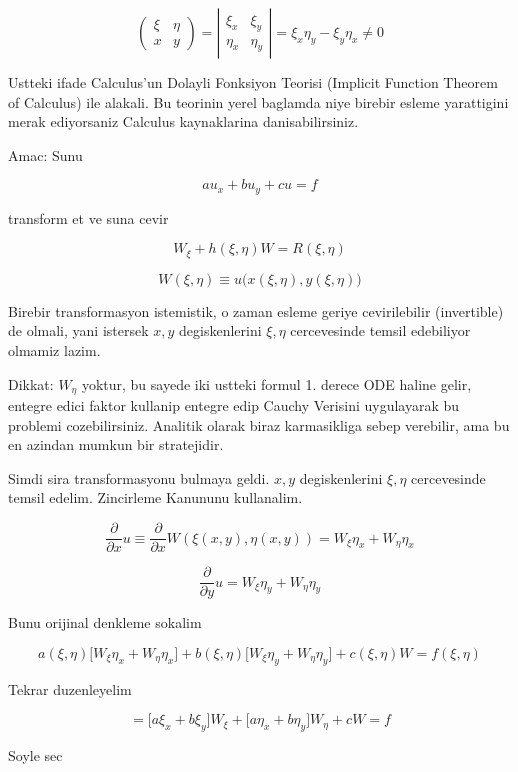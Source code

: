 \documentclass[12pt,fleqn]{article}\usepackage{../common}
\begin{document}
\[ 
\left(\begin{array}{rr}
\xi & \eta \\
x & y
\end{array}\right) = 
\left|\begin{array}{rr}
\xi_x & \xi_y \\
\eta_x & \eta_y
\end{array}\right| =
\xi_x \eta_y - \xi_y \eta_x \ne 0
 \]

Ustteki ifade Calculus'un Dolayli Fonksiyon Teorisi (Implicit Function
Theorem of Calculus) ile alakali. Bu teorinin yerel baglamda niye birebir
esleme yarattigini merak ediyorsaniz Calculus kaynaklarina
danisabilirsiniz. 

Amac: Sunu 

\[ au_x + bu_y + cu = f \]

transform et ve suna cevir

\[ W_\xi + h(\xi, \eta)W = R(\xi,\eta)\]


\[ W(\xi,\eta) \equiv u \bigg( x(\xi,\eta),y(\xi,\eta) \bigg) \]

Birebir transformasyon istemistik, o zaman esleme geriye cevirilebilir
(invertible) de olmali, yani istersek $x,y$ degiskenlerini $\xi,\eta$
cercevesinde temsil edebiliyor olmamiz lazim. 

Dikkat: $W_\eta$ yoktur, bu sayede iki ustteki formul 1. derece ODE haline
gelir, entegre edici faktor kullanip entegre edip Cauchy Verisini
uygulayarak bu problemi cozebilirsiniz. Analitik olarak biraz karmasikliga
sebep verebilir, ama bu en azindan mumkun bir stratejidir. 

Simdi sira transformasyonu bulmaya geldi. $x,y$ degiskenlerini $\xi,\eta$
cercevesinde temsil edelim. Zincirleme Kanununu kullanalim. 

\[ \frac{\partial }{\partial x}u \equiv
\frac{\partial }{\partial x}W(\xi(x,y),\eta(x,y)) =
W_\xi\eta_x + W_\eta\eta_x 
 \]

\[ \frac{\partial }{\partial y}u =
W_\xi\eta_y + W_\eta\eta_y
 \]

Bunu orijinal denkleme sokalim

\[ 
a(\xi,\eta) \bigg[W_\xi \eta_x + W_\eta\eta_x \bigg] +
b(\xi,\eta) \bigg[W_\xi \eta_y + W_\eta\eta_y  \bigg] + 
c(\xi,\eta)W = f(\xi,\eta)
 \]

Tekrar duzenleyelim

\[ = 
\bigg[ a\xi_x + b\xi_y \bigg] W_\xi + 
\bigg[ a\eta_x + b\eta_y \bigg] W_\eta +
cW = f
 \]

Soyle sec
\end{document}
